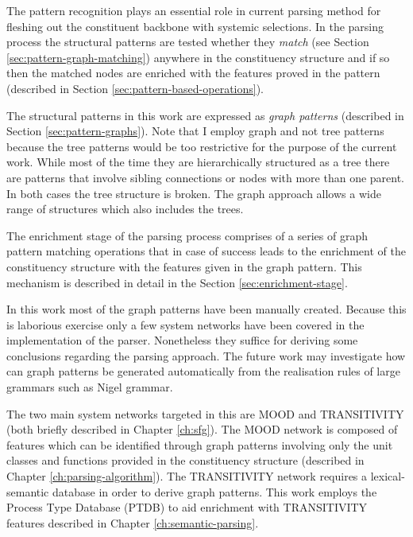 The pattern recognition plays an essential role in current parsing method for fleshing out the constituent backbone with systemic selections. In the parsing process the structural patterns are tested whether they \textit{match} (see Section \ref{sec:pattern-graph-matching}) anywhere in the constituency structure and if so then the matched nodes are enriched with the features proved in the pattern (described in Section \ref{sec:pattern-based-operations}). 

The structural patterns in this work are expressed as \textit{graph patterns} (described in Section \ref{sec:pattern-graphs}). Note that I employ graph and not tree patterns because the tree patterns would be too restrictive for the purpose of the current work. While most of the time they are hierarchically structured as a tree there are patterns that involve sibling connections or nodes with more than one parent. In both cases the tree structure is broken. The graph approach allows a wide range of structures which also includes the trees. 

The enrichment stage of the parsing process comprises of a series of graph pattern matching operations that in case of success leads to the enrichment of the constituency structure with the features given in the graph pattern. This mechanism is described in detail in the Section \ref{sec:enrichment-stage}. 

In this work most of the graph patterns have been manually created. Because this is laborious exercise only a few system networks have been covered in the implementation of the parser. Nonetheless they suffice for deriving some conclusions regarding the parsing approach. The future work may investigate how can graph patterns be generated automatically from the realisation rules of large grammars such as Nigel grammar. 

The two main system networks targeted in this are MOOD and TRANSITIVITY (both briefly described in Chapter \ref{ch:sfg}). The MOOD network is composed of features which can be identified through graph patterns involving only the unit classes and functions provided in the constituency structure (described in Chapter \ref{ch:parsing-algorithm}). The TRANSITIVITY network requires a lexical-semantic database in order to derive graph patterns. This work employs the Process Type Database (PTDB) \citep{Neale2002} to aid enrichment with TRANSITIVITY features described in Chapter \ref{ch:semantic-parsing}.  





